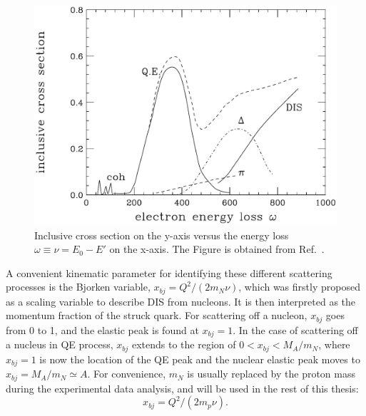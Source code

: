 \begin{figure}[!ht]
  \begin{center}
    \includegraphics[type=pdf,ext=.pdf,read=.pdf,width=0.60\linewidth]{./figures/physics/eesm}
    \caption[Electron energy transfer]{\footnotesize{Inclusive cross section on the y-axis versus the energy loss $\omega\equiv\nu=E_{0}-E'$ on the x-axis. The Figure is obtained from Ref.~\cite{qe_donal}.}}
    \label{e_trans}
  \end{center}
\end{figure}

A convenient kinematic parameter for identifying these different scattering processes is the Bjorken variable, $x_{bj}=Q^{2}/(2m_{N}\nu)$, which was firstly proposed as a scaling variable to describe DIS from nucleons. It is then interpreted as the momentum fraction of the struck quark. For scattering off a nucleon, $x_{bj}$ goes from 0 to 1, and the elastic peak is found at $x_{bj}=1$. In the case of scattering off a nucleus in QE process, $x_{bj}$ extends to the region of $0<x_{bj}<M_{A}/m_{N}$, where $x_{bj}=1$ is now the location of the QE peak and the nuclear elastic peak moves to $x_{bj}=M_{A}/m_{N}\simeq A$. For convenience, $m_{N}$ is usually replaced by the proton mass during the experimental data analysis, and will be used in the rest of this thesis:
\begin{equation}
  x_{bj} = Q^{2}/(2m_{p}\nu).
  \label{xbj_define}
\end{equation}
  
